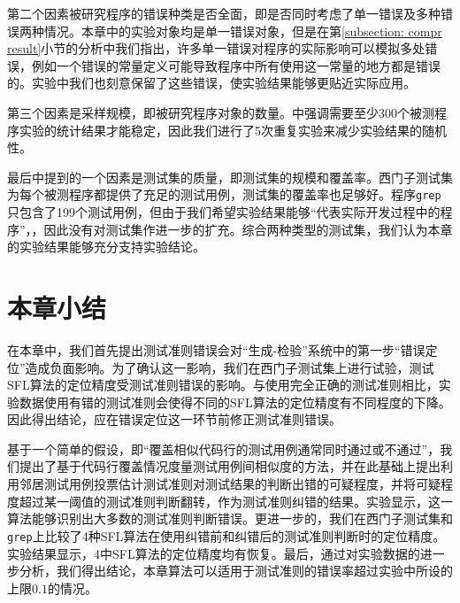 第二个因素被研究程序的错误种类是否全面，即是否同时考虑了单一错误及多种错误两种情况。本章中的实验对象均是单一错误对象，但是在第\ref{subsection: compr result}小节的分析中我们指出，许多单一错误对程序的实际影响可以模拟多处错误，例如一个错误的常量定义可能导致程序中所有使用这一常量的地方都是错误的。实验中我们也刻意保留了这些错误，使实验结果能够更贴近实际应用。

第三个因素是采样规模，即被研究程序对象的数量。\cite{Steimann:2013:TVV:2483760.2483767}中强调需要至少300个被测程序实验的统计结果才能稳定，因此我们进行了5次重复实验来减少实验结果的随机性。

最后\cite{Steimann:2013:TVV:2483760.2483767}中提到的一个因素是测试集的质量，即测试集的规模和覆盖率。西门子测试集为每个被测程序都提供了充足的测试用例，测试集的覆盖率也足够好。程序\texttt{grep}只包含了199个测试用例，但由于我们希望实验结果能够“代表实际开发过程中的程序”，\cite{doESE05}，因此没有对测试集作进一步的扩充。综合两种类型的测试集，我们认为本章的实验结果能够充分支持实验结论。


\section{本章小结}

在本章中，我们首先提出测试准则错误会对“生成-检验”系统中的第一步“错误定位”造成负面影响。为了确认这一影响，我们在西门子测试集上进行试验，测试SFL算法的定位精度受测试准则错误的影响。与使用完全正确的测试准则相比，实验数据使用有错的测试准则会使得不同的SFL算法的定位精度有不同程度的下降。因此得出结论，应在错误定位这一环节前修正测试准则错误。

基于一个简单的假设，即“覆盖相似代码行的测试用例通常同时通过或不通过”，我们提出了基于代码行覆盖情况度量测试用例间相似度的方法，并在此基础上提出利用邻居测试用例投票估计测试准则对测试结果的判断出错的可疑程度，并将可疑程度超过某一阈值的测试准则判断翻转，作为测试准则纠错的结果。实验显示，这一算法能够识别出大多数的测试准则判断错误。更进一步的，我们在西门子测试集和\texttt{grep}上比较了4种SFL算法在使用纠错前和纠错后的测试准则判断时的定位精度。实验结果显示，4中SFL算法的定位精度均有恢复。最后，通过对实验数据的进一步分析，我们得出结论，本章算法可以适用于测试准则的错误率超过实验中所设的上限$0.1$的情况。